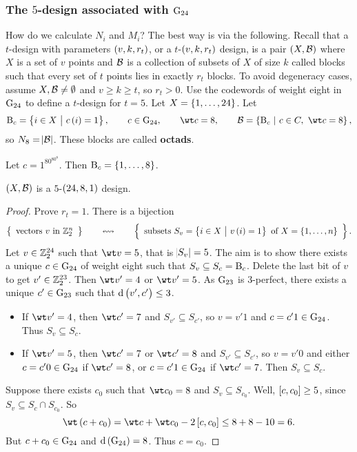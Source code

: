 \pagebreak

\subsubsection{The \texorpdfstring{$ 5 $}{5}-design associated with \texorpdfstring{$ \mathrm{G}_{24} $}{G24}}

How do we calculate $ N_i $ and $ M_i $? The best way is via the following. Recall that a $ t $-design with parameters $ \br{v, k, r_t} $, or a $ t $-$ \br{v, k, r_t} $ design, is a pair $ \br{X, \BBB} $ where $ X $ is a set of $ v $ points and $ \mathcal{B} $ is a collection of subsets of $ X $ of size $ k $ called blocks such that every set of $ t $ points lies in exactly $ r_t $ blocks. To avoid degeneracy cases, assume $ X, \mathcal{B} \ne \emptyset $ and $ v \ge k \ge t $, so $ r_t > 0 $. Use the codewords of weight eight in $ \mathrm{G}_{24} $ to define a $ t $-design for $ t = 5 $. Let $ X = \cbr{1, \dots, 24} $. Let
$$ \B_c = \cbr{i \in X \st c\br{i} = 1}, \qquad c \in \G_{24}, \qquad \wt c = 8, \qquad \BBB = \cbr{\B_c \st c \in C, \ \wt c = 8}, $$
so $ N_8 = \abs{\mathcal{B}} $. These blocks are called \textbf{octads}.

\begin{example*}
Let $ c = 1^80^80^8 $. Then $ \B_c = \cbr{1, \dots, 8} $.
\end{example*}


\begin{theorem}
$ \br{X, \BBB} $ is a $ 5 $-$ \br{24, 8, 1} $ design.
\end{theorem}

\begin{proof}
Prove $ r_t = 1 $. There is a bijection
$$ \correspondence{\text{vectors} \ v \ \text{in} \ \ZZ_2^n}{\text{subsets} \ S_v = \cbr{i \in X \st v\br{i} = 1} \ \text{of} \ X = \cbr{1, \dots, n}}. $$
Let $ v \in \mathbb{Z}_2^{24} $ such that $ \wt v = 5 $, that is $ \abs{S_v} = 5 $. The aim is to show there exists a unique $ c \in \mathrm{G}_{24} $ of weight eight such that $ S_v \subseteq S_c = \mathrm{B}_c $. Delete the last bit of $ v $ to get $ v' \in \mathbb{Z}_2^{23} $. Then $ \wt v' = 4 $ or $ \wt v' = 5 $. As $ \mathrm{G}_{23} $ is $ 3 $-perfect, there exists a unique $ c' \in \mathrm{G}_{23} $ such that $ \d\br{v', c'} \le 3 $.
\begin{itemize}
\item If $ \wt v' = 4 $, then $ \wt c' = 7 $ and $ S_{v'} \subseteq S_{c'} $, so $ v = v'1 $ and $ c = c'1 \in \mathrm{G}_{24} $. Thus $ S_v \subseteq S_c $.
\item If $ \wt v' = 5 $, then $ \wt c' = 7 $ or $ \wt c' = 8 $ and $ S_{v'} \subseteq S_{c'} $, so $ v = v'0 $ and either $ c = c'0 \in \mathrm{G}_{24} $ if $ \wt c' = 8 $, or $ c = c'1 \in \mathrm{G}_{24} $ if $ \wt c' = 7 $. Then $ S_v \subseteq S_c $.
\end{itemize}
Suppose there exists $ c_0 $ such that $ \wt c_0 = 8 $ and $ S_v \subseteq S_{c_0} $. Well, $ \sbr{c, c_0} \ge 5 $, since $ S_v \subseteq S_c \cap S_{c_0} $. So
$$ \wt \br{c + c_0} = \wt c + \wt c_0 - 2\sbr{c, c_0} \le 8 + 8 - 10 = 6. $$
But $ c + c_0 \in \mathrm{G}_{24} $ and $ \d\br{\G_{24}} = 8 $. Thus $ c = c_0 $.
\end{proof}

